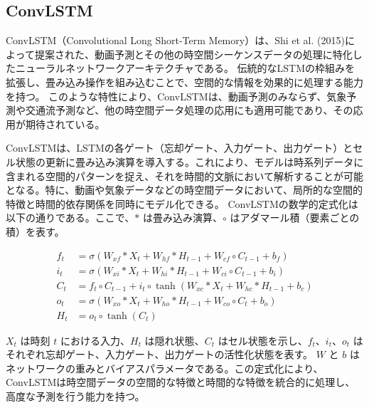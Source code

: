     \subsection{ConvLSTM}
      ConvLSTM（Convolutional Long Short-Term Memory）は、Shi et al. (2015)によって提案された、動画予測とその他の時空間シーケンスデータの処理に特化したニューラルネットワークアーキテクチャである。
      伝統的なLSTMの枠組みを拡張し、畳み込み操作を組み込むことで、空間的な情報を効果的に処理する能力を持つ。
      このような特性により、ConvLSTMは、動画予測のみならず、気象予測や交通流予測など、他の時空間データ処理の応用にも適用可能であり、その応用が期待されている。

      ConvLSTMは、LSTMの各ゲート（忘却ゲート、入力ゲート、出力ゲート）とセル状態の更新に畳み込み演算を導入する。これにより、モデルは時系列データに含まれる空間的パターンを捉え、それを時間的文脈において解析することが可能となる。特に、動画や気象データなどの時空間データにおいて、局所的な空間的特徴と時間的依存関係を同時にモデル化できる。
      ConvLSTMの数学的定式化は以下の通りである。ここで、\( \ast \) は畳み込み演算、\( \circ \) はアダマール積（要素ごとの積）を表す。

      \begin{align}
        f_t &= \sigma(W_{xf} \ast X_t + W_{hf} \ast H_{t-1} + W_{cf} \circ C_{t-1} + b_f) \\
        i_t &= \sigma(W_{xi} \ast X_t + W_{hi} \ast H_{t-1} + W_{ci} \circ C_{t-1} + b_i) \\
        C_t &= f_t \circ C_{t-1} + i_t \circ \tanh(W_{xc} \ast X_t + W_{hc} \ast H_{t-1} + b_c) \\
        o_t &= \sigma(W_{xo} \ast X_t + W_{ho} \ast H_{t-1} + W_{co} \circ C_t + b_o) \\
        H_t &= o_t \circ \tanh(C_t)
      \end{align}

      \( X_t \) は時刻 \( t \) における入力、\( H_t \) は隠れ状態、\( C_t \) はセル状態を示し、\( f_t \)、\( i_t \)、\( o_t \) はそれぞれ忘却ゲート、入力ゲート、出力ゲートの活性化状態を表す。
      \( W \) と \( b \) はネットワークの重みとバイアスパラメータである。この定式化により、ConvLSTMは時空間データの空間的な特徴と時間的な特徴を統合的に処理し、高度な予測を行う能力を持つ。


